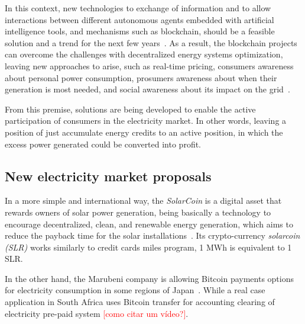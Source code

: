 In this context,
new technologies to exchange of information and to allow interactions between different autonomous agents %
embedded with artificial intelligence tools, and mechanisms such as blockchain, should be a feasible solution and a trend for the next few years~\cite{Coelho2017MAS}. %
As a result, the blockchain projects can overcome the challenges with decentralized energy systems optimization,
leaving new approaches to arise, such as real-time pricing, consumers awareness about personal power consumption, prosumers awareness about when their generation is most needed, and social awareness about its impact on the grid~\cite{peck2017,wec2017}.

From this premise, solutions are being developed to enable the active participation of consumers in the electricity market.
In other words, leaving a position of just accumulate energy credits to an active position, in which the excess power generated could be converted into profit. %



\subsection{New electricity market proposals~\label{sec:propostas}}

In a more simple and international way, the \emph{SolarCoin} is a digital asset that rewards owners of solar power generation, being basically a technology to encourage decentralized, clean, and renewable energy generation,
which aims to reduce the payback time for the solar installations~\cite{mit-dci}.
Its crypto-currency \emph{solarcoin (SLR)} works similarly to credit cards miles program, 1 MWh is equivalent to 1 SLR.

In the other hand, the Marubeni company is allowing Bitcoin payments options for electricity consumption in some regions of Japan~\cite{groarke2016}.
While a real case application in South Africa uses Bitcoin transfer for accounting clearing of electricity pre-paid system \textcolor{red}{[como citar um vídeo?]}.

